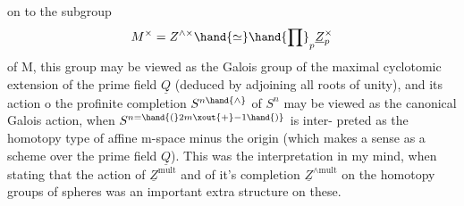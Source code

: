 on to the  subgroup
\[ M^\times = Z^{\wedge\times} \hand{\simeq} \hand{\prod}_p \underline{Z}_p^\times \]
of M,  this group may be viewed as the  Galois group of the maximal
cyclotomic extension of the prime field $\underline{Q}$  (deduced by adjoining\unsure{\hand{,}} all
roots of unity),  and its action o  the profinite completion $S^{n\hand{\wedge}}$ of $S^n$
may be viewed as the canonical Galois action,  when $S^{n=\hand{(}2m\xout{+}-1\hand{)}}$ is inter-%
preted as the homotopy type of affine  m-space minus the origin
(which makes a sense as a scheme over  the prime field $\underline{Q}$).  This was
the interpretation in my mind,  when stating that the action of $\underline{Z}^{\mathrm{mult}}$
and of it's completion $\underline{Z}^{\wedge\mathrm{mult}}$  on the homotopy groups of spheres was
an important extra structure on these.


